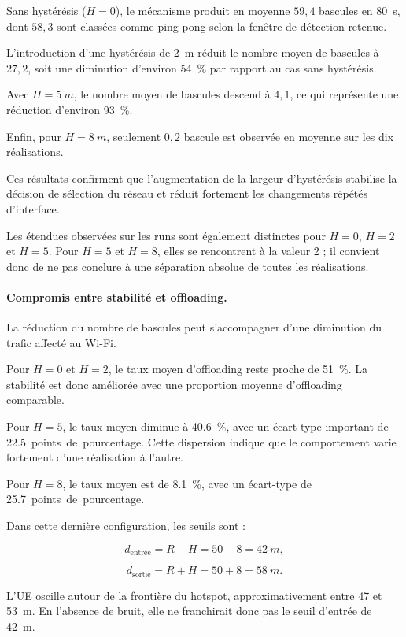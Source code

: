 Sans hystérésis ($H=0$), le mécanisme produit en moyenne
$59{,}4$ bascules en \SI{80}{s}, dont $58{,}3$ sont classées
comme ping-pong selon la fenêtre de détection retenue.

L'introduction d'une hystérésis de \SI{2}{m} réduit le nombre moyen
de bascules à $27{,}2$, soit une diminution d'environ
\SI{54}{\percent} par rapport au cas sans hystérésis.

Avec $H=\SI{5}{m}$, le nombre moyen de bascules descend à $4{,}1$,
ce qui représente une réduction d'environ \SI{93}{\percent}.

Enfin, pour $H=\SI{8}{m}$, seulement $0{,}2$ bascule est observée
en moyenne sur les dix réalisations.

Ces résultats confirment que l'augmentation de la largeur
d'hystérésis stabilise la décision de sélection du réseau et réduit
fortement les changements répétés d'interface.

Les étendues observées sur les runs sont également distinctes
pour $H=0$, $H=2$ et $H=5$. Pour $H=5$ et $H=8$, elles se
rencontrent à la valeur 2 ; il convient donc de ne pas conclure
à une séparation absolue de toutes les réalisations.

\paragraph{Compromis entre stabilité et offloading.}

La réduction du nombre de bascules peut s'accompagner d'une
diminution du trafic affecté au Wi-Fi.

Pour $H=0$ et $H=2$, le taux moyen d'offloading reste proche
de \SI{51}{\percent}. La stabilité est donc améliorée avec une
proportion moyenne d'offloading comparable.

Pour $H=5$, le taux moyen diminue à \SI{40,6}{\percent},
avec un écart-type important de \SI{22,5}{points de pourcentage}.
Cette dispersion indique que le comportement varie fortement
d'une réalisation à l'autre.

Pour $H=8$, le taux moyen est de \SI{8,1}{\percent}, avec un
écart-type de \SI{25,7}{points de pourcentage}.

Dans cette dernière configuration, les seuils sont :

\[
d_{\text{entrée}} = R-H = 50-8 = \SI{42}{m},
\]

\[
d_{\text{sortie}} = R+H = 50+8 = \SI{58}{m}.
\]

L'UE oscille autour de la frontière du hotspot, approximativement
entre 47 et \SI{53}{m}. En l'absence de bruit, elle ne franchirait
donc pas le seuil d'entrée de \SI{42}{m}.

